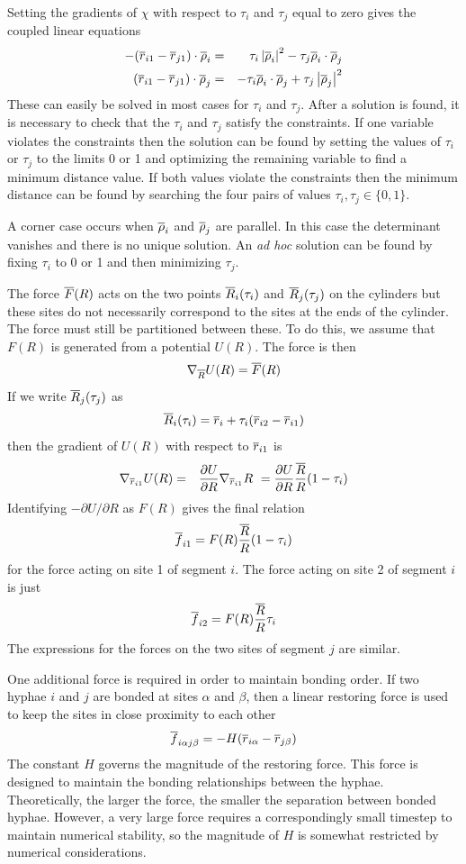 \documentclass[12pt]{article}
\begin{document}
Setting the gradients of $\chi$ with respect to $\tau_i$ and $\tau_j$ equal to
zero gives the coupled linear equations
\begin{eqnarray*}
-(\overline{r}_{i1}-\overline{r}_{j1})\cdot\overline{\rho}_i & = & \tau_i\left|\overline{\rho}_i\right|^2
                                        - \tau_j\overline{\rho}_i\cdot\overline{\rho}_j \\
(\overline{r}_{i1}-\overline{r}_{j1})\cdot\overline{\rho}_j & = & - \tau_i\overline{\rho}_i\cdot\overline{\rho}_j
                                       + \tau_j\left|\overline{\rho}_j\right|^2
\end{eqnarray*}
These can easily be solved in most cases for $\tau_i$ and $\tau_j$.
After a solution is found, it is necessary to check that the $\tau_i$ and $\tau_j$
satisfy the constraints. If one variable violates the constraints then the solution
can be found by setting the values of $\tau_i$ or $\tau_j$ to the limits 0 or 1 and
optimizing the remaining variable to find a minimum distance value. 
If both values violate the constraints then the minimum distance can be found
by searching the four pairs of values $\tau_i,\tau_j\in\{0,1\}$.

A corner case occurs when $\overline{\rho}_i$ and $\overline{\rho}_j$ are parallel. In this case the
determinant vanishes and there is no unique solution. An {\em ad hoc} solution can be
found by fixing $\tau_i$ to 0 or 1 and then minimizing $\tau_j$.

The force $\overline{F}(R)$ acts on the two points $\overline{R}_i(\tau_i)$ and
$\overline{R}_j(\tau_j)$ on the cylinders but these sites do not necessarily correspond
to the sites at the ends of the cylinder.  The force must still be partitioned
between these. To do
this, we assume that $F(R)$ is generated from a potential $U(R)$. The force is
then
\[
\nabla_{\overline{R}}U(R) = \overline{F}(R)
\]
If we write $\overline{R}_j(\tau_j)$ as
\[
\overline{R}_i(\tau_i) = \overline{r}_i + \tau_i (\overline{r}_{i2}-\overline{r}_{i1})
\]
then the gradient of $U(R)$ with respect to $\overline{r}_{i1}$ is
\begin{eqnarray*}
\nabla_{\overline{r}_{i1}}U(R) & = & \frac{\partial U}{\partial R}\nabla_{\overline{r}_{i1}}R\
 = \frac{\partial U}{\partial R}\frac{\overline{R}}{R} (1-\tau_i)
\end{eqnarray*}
Identifying $-\partial U/\partial R$ as $F(R)$ gives the final relation
\[
\overline{f}_{i1} = F(R)\frac{\overline{R}}{R}(1-\tau_i)
\]
for the force acting on site 1 of segment $i$. The force acting on site 2 of segment
$i$ is just
\[
\overline{f}_{i2} = F(R)\frac{\overline{R}}{R}\tau_i
\]
The expressions for the forces on the two sites of segment $j$ are similar.

One additional force is required in order to maintain bonding order. If two
hyphae $i$ and $j$ are bonded at sites $\alpha$ and $\beta$, then a linear
restoring force is used to keep the sites in close proximity to each other
\[
\overline{f}_{i\alpha j\beta} = -H(\overline{r}_{i\alpha}-\overline{r}_{j\beta})
\]
The constant $H$ governs the magnitude of the restoring force. This force is
designed to maintain the bonding relationships between the hyphae.
Theoretically, the larger the force, the smaller the separation between bonded
hyphae. However, a very large force requires a correspondingly small timestep to
maintain numerical stability, so the magnitude of $H$ is somewhat restricted by
numerical considerations.
\end{document}
